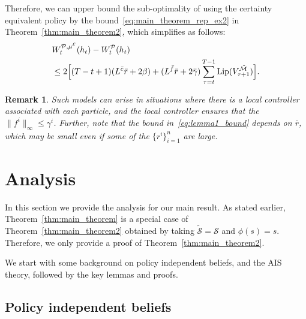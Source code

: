 \documentclass[letterpaper, 10pt]{IEEEtran}
\theoremstyle{plain}
\newtheorem{remark}{Remark}
\theoremstyle{nonumberplain}
\theoremstyle{plain}
\newcommand*\ALPHABET{\mathcal}
\newcommand*\ABSTRACT{\tilde}
\newcommand\EST{\mathcal{E}}
\DeclareMathOperator{\Lip}{Lip}
\begin{document}
Therefore, we can upper bound the sub-optimality of using the certainty equivalent policy by the bound~\eqref{eq:main_theorem_rep_ex2} in Theorem~\ref{thm:main_theorem2}, which simplifies as follows:
\begin{align}\label{eq:lemma1_bound}
   &W^{\ALPHABET P,\mu^\EST}_t(h_t) - W^{\ALPHABET P}_t(h_t) \nonumber \\
   &\leq 2 \Bigl[ (T-t+1) (L^{\bar c}\bar r + 2\beta) + (L^{\bar f}\bar r + 2 \bar \gamma)\sum_{\tau = t}^{T-1} \Lip(V_{\tau+1}^{\ABSTRACT{\ALPHABET M}})\Bigr].
\end{align}
\begin{remark}
   Such models can arise in situations where there is a local controller associated with each particle, and the local controller ensures that the $\|f^i\|_{\infty} \leq \gamma ^i$. Further, note that the bound in~\eqref{eq:lemma1_bound} depends on $\bar r$, which may be small even if some of the $\{r^i\}_{i=1}^n$ are large.
\end{remark}

\section{Analysis}\label{sec:analysis}

In this section we provide the analysis for our main result. As stated earlier, Theorem~\ref{thm:main_theorem} is a special case of Theorem~\ref{thm:main_theorem2} obtained by taking $\ABSTRACT{\ALPHABET S} = \ALPHABET S$ and $\phi(s)=s$. Therefore, we only provide a proof of Theorem~\ref{thm:main_theorem2}.

We start with some background on policy independent beliefs,  and the AIS theory, followed by the key lemmas and proofs.

\subsection{Policy independent beliefs}\label{sec:pib}
\end{document}
